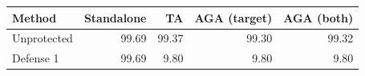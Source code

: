 \begin{tabular}{lrrrr}
\toprule
Method & Standalone & TA & AGA (target) & AGA (both) \\
\midrule
Unprotected & 99.69 & 99.37 & 99.30 & 99.32 \\
Defense 1 & 99.69 & 9.80 & 9.80 & 9.80 \\
\bottomrule
\end{tabular}
